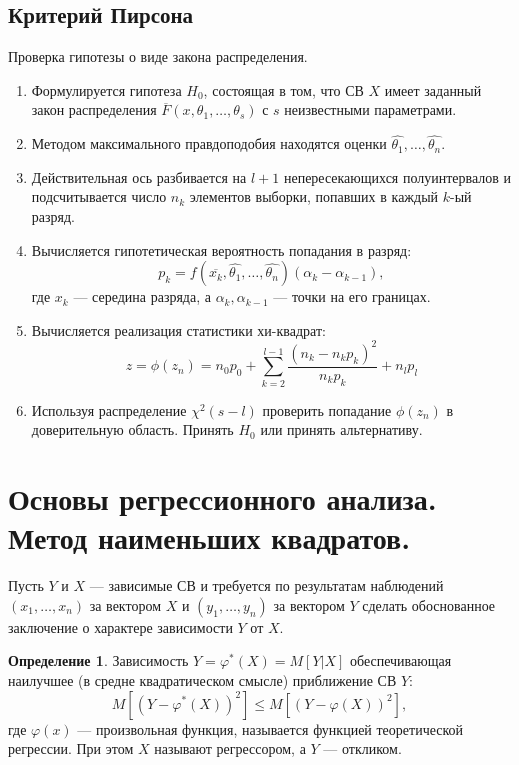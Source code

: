 \documentclass[12pt]{report}
\theoremstyle{definition}
\newtheorem{definition}[theorem]{Определение}
\begin{document}
\subsection{Критерий Пирсона}

Проверка гипотезы о виде закона распределения.

\begin{enumerate}
\item Формулируется гипотеза $H_0$, состоящая в том, что СВ $X$
  имеет заданный закон распределения $\overline{F}(x, \theta_1,\dots, \theta_s)$
  с $s$ неизвестными параметрами.
\item Методом максимального правдоподобия находятся оценки
  $\hat{\theta_1}, \dots, \hat{\theta_n}$.
\item Действительная ось разбивается на $l+1$ непересекающихся
  полуинтервалов и подсчитывается число $n_k$ элементов выборки, попавших
  в каждый $k$-ый разряд.
\item Вычисляется гипотетическая вероятность попадания в разряд:
  $$
    p_k = f(\overline{x_k}, \hat{\theta_1}, \dots, \hat{\theta_n})
    (\alpha_k - \alpha_{k-1}),
  $$
  где $x_k$ --- середина разряда, а $\alpha_k, \alpha_{k-1}$ --- точки
  на его границах.
\item Вычисляется реализация статистики хи-квадрат:
$$
z = \phi(z_n) = 
n_0 p_0 + \sum\limits_{k = 2}^{l-1} \dfrac{(n_k - n_k p_k)^2}{n_k p_k} + n_l p_l
$$
\item Используя распределение $\chi^2(s - l)$ проверить попадание
  $\phi(z_n)$ в доверительную область. Принять $H_0$ или принять
  альтернативу.
\end{enumerate}



\section{Основы регрессионного анализа. Метод наименьших квадратов.}
Пусть $Y$ и $X$ --- зависимые СВ и требуется по результатам наблюдений
$(x_1, \dots, x_n)$ за вектором $X$ и $(y_1, \dots, y_n)$ за вектором
$Y$ сделать обоснованное заключение о характере зависимости $Y$ от $X$.

\begin{definition}
Зависимость $Y = \varphi^*(X) = M[Y|X]$ обеспечивающая наилучшее
(в средне квадратическом смысле) приближение СВ $Y$:
$$
M[(Y - \varphi^*(X))^2] \le M[(Y - \varphi(X))^2],
$$
где $\varphi(x)$ --- произвольная функция, называется функцией
теоретической регрессии. При этом $X$ называют регрессором, а
$Y$ --- откликом.
\end{definition}
\end{document}

